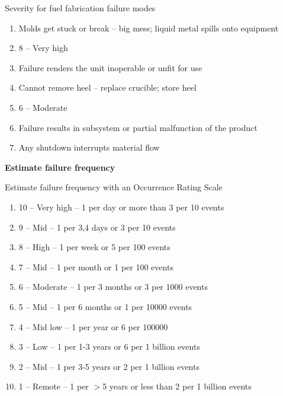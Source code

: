 \documentclass[aspectratio=1610,pdftex,dvipsnames,compress,xcolor={dvipsnames}]{beamer}
\begin{document}
\begin{frame}{Severity for fuel fabrication failure modes}
    \begin{enumerate}[series=outerlist,topsep=0pt,itemsep=3pt,leftmargin=*,label=(\arabic*)]
        \item[]Molds get stuck or break -- big mess; liquid metal spills onto equipment
        \item[]8 -- Very high 
        \item[]Failure renders the unit inoperable or unfit for use
            \vspace{0.10in}
        \item[]Cannot remove heel -- replace crucible; store heel
        \item[]6 -- Moderate
        \item[]Failure results in subsystem or partial malfunction of the product
            \vspace{0.10in}
        \item[]Any shutdown interrupts material flow
    \end{enumerate}
\end{frame}


\begin{frame}[plain]{}
    \centering\LARGE\textbf{Estimate failure frequency}
\end{frame}


\addtocounter{framenumber}{-1}
\begin{frame}{Estimate failure frequency with an Occurrence Rating Scale}
    \begin{enumerate}[series=outerlist,topsep=0pt,itemsep=3pt,leftmargin=*,label=(\arabic*)]
        \item[]10 -- Very high -- 1 per day or more than 3 per 10 events
        \item[]9 -- Mid -- 1 per 3,4 days or 3 per 10 events
        \item[]8 -- High -- 1 per week or 5 per 100 events
        \item[]7 -- Mid -- 1 per month or 1 per 100 events
        \item[]6 -- Moderate -- 1 per 3 months or 3 per 1000 events
        \item[]5 -- Mid -- 1 per 6 months or 1 per 10000 events
        \item[]4 -- Mid low -- 1 per year or 6 per 100000  
        \item[]3 -- Low -- 1 per 1-3 years or 6 per 1 billion events
        \item[]2 -- Mid -- 1 per 3-5 years or 2 per 1 billion events
        \item[]1 -- Remote -- 1 per $>$5 years or less than 2 per 1 billion events
    \end{enumerate}
\end{frame}
\end{document}
